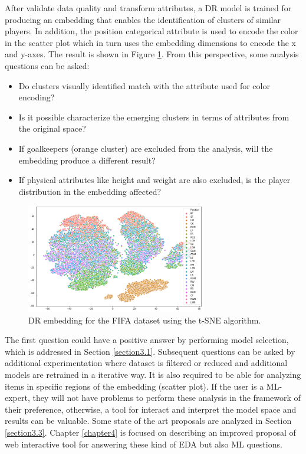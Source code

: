 After validate data quality and transform attributes, a DR model is trained for producing an embedding that enables the identification of clusters of similar players. In addition, the position categorical attribute is used to encode the color in the scatter plot which in turn uses the embedding dimensions to encode the x and y-axes. The result is shown in Figure \ref{fig:fifa-tsne}. From this perspective, some analysis questions can be asked: 
\begin{itemize}
\item Do clusters visually identified match with the attribute used for color encoding?
\item Is it possible characterize the emerging clusters in terms of attributes from the original space?
\item If goalkeepers (orange cluster) are excluded from the analysis, will the embedding produce a different result?
\item If physical attributes like height and weight are also excluded, is the player distribution in the embedding affected?  
\end{itemize}

\begin{figure}[ht]
 \centering
 \includegraphics[width=0.7\textwidth]{fifa-tsne.png}
 \caption{DR embedding for the FIFA dataset using the t-SNE algorithm.}
 \label{fig:fifa-tsne}
\end{figure}

The first question could have a positive answer by performing model selection, which is addressed in Section \ref{section3.1}. Subsequent questions can be asked by additional experimentation where dataset is filtered or reduced and additional models are retrained in a iterative way. It is also required to be able for analyzing items in specific regions of the embedding (scatter plot). If the user is a ML-expert, they will not have problems to perform these analysis in the framework of their preference, otherwise, a tool for interact and interpret the model space and results can be valuable. Some state of the art proposals are analyzed in Section \ref{section3.3}. Chapter \ref{chapter4} is focused on describing an improved proposal of web interactive tool for answering these kind of EDA but also ML questions.

